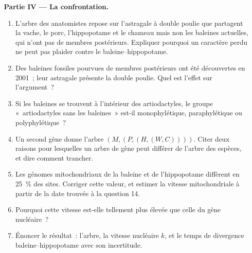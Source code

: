 \begin{problem}
\medskip
\noindent\textbf{Partie IV --- La confrontation.}
\begin{enumerate}[resume]
  \item L'arbre des anatomistes repose sur l'astragale à double poulie
        que partagent la vache, le porc, l'hippopotame et le chameau mais
        non les baleines actuelles, qui n'ont pas de membres postérieurs.
        Expliquer pourquoi un caractère perdu ne peut pas plaider contre
        le  baleine--hippopotame.
  \item Des baleines fossiles pourvues de membres postérieurs ont été
        découvertes en 2001~; leur astragale présente la double poulie.
        Quel est l'effet sur l'argument~?
  \item Si les baleines se trouvent à l'intérieur des artiodactyles, le
        groupe «~artiodactyles sans les baleines~» est-il monophylétique,
        paraphylétique ou polyphylétique~?
  \item Un second gène donne l'arbre $(M,(P,(H,(W,C))))$. Citer deux
        raisons pour lesquelles un arbre de gène peut différer de l'arbre
        des espèces, et dire comment trancher.
  \item Les génomes mitochondriaux de la baleine et de l'hippopotame
        diffèrent en \qty{25}{\%} des sites. Corriger cette valeur, et
        estimer la vitesse mitochondriale à partir de la date trouvée à la
        question 14.
  \item Pourquoi cette vitesse est-elle tellement plus élevée que celle du
        gène nucléaire~?
  \item Énoncer le résultat~: l'arbre, la vitesse nucléaire $k$, et le
        temps de divergence baleine--hippopotame avec son incertitude.
\end{enumerate}
\end{problem}
